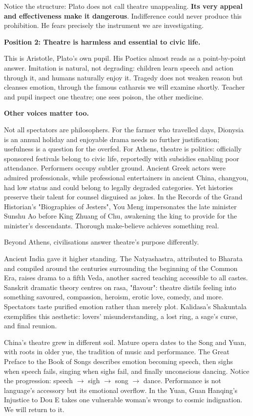 Notice the structure: Plato does not call theatre unappealing. \textbf{Its very appeal and effectiveness make it dangerous}. Indifference could never produce this prohibition. He fears precisely the instrument we are investigating.

\textbf{Position 2: Theatre is harmless and essential to civic life.}

This is Aristotle, Plato's own pupil. His Poetics almost reads as a point-by-point answer. Imitation is natural, not degrading: children learn speech and action through it, and humans naturally enjoy it. Tragedy does not weaken reason but cleanses emotion, through the famous catharsis we will examine shortly. Teacher and pupil inspect one theatre; one sees poison, the other medicine.

\textbf{Other voices matter too.}

Not all spectators are philosophers. For the farmer who travelled days, Dionysia is an annual holiday and enjoyable drama needs no further justification; usefulness is a question for the overfed. For Athens, theatre is politics: officially sponsored festivals belong to civic life, reportedly with subsidies enabling poor attendance. Performers occupy subtler ground. Ancient Greek actors were admired professionals, while professional entertainers in ancient China, changyou, had low status and could belong to legally degraded categories. Yet histories preserve their talent for counsel disguised as jokes. In the Records of the Grand Historian's "Biographies of Jesters", You Meng impersonates the late minister Sunshu Ao before King Zhuang of Chu, awakening the king to provide for the minister's descendants. Thorough make-believe achieves something real.

Beyond Athens, civilisations answer theatre's purpose differently.

Ancient India gave it higher standing. The Natyashastra, attributed to Bharata and compiled around the centuries surrounding the beginning of the Common Era, raises drama to a fifth Veda, another sacred teaching accessible to all castes. Sanskrit dramatic theory centres on rasa, "flavour": theatre distils feeling into something savoured, compassion, heroism, erotic love, comedy, and more. Spectators taste purified emotion rather than merely plot. Kalidasa's Shakuntala exemplifies this aesthetic: lovers' misunderstanding, a lost ring, a sage's curse, and final reunion.

China's theatre grew in different soil. Mature opera dates to the Song and Yuan, with roots in older yue, the tradition of music and performance. The Great Preface to the Book of Songs describes emotion becoming speech, then sighs when speech fails, singing when sighs fail, and finally unconscious dancing. Notice the progression: speech $\rightarrow$ sigh $\rightarrow$ song $\rightarrow$ dance. Performance is not language's accessory but its emotional overflow. In the Yuan, Guan Hanqing's Injustice to Dou E takes one vulnerable woman's wrongs to cosmic indignation. We will return to it.

